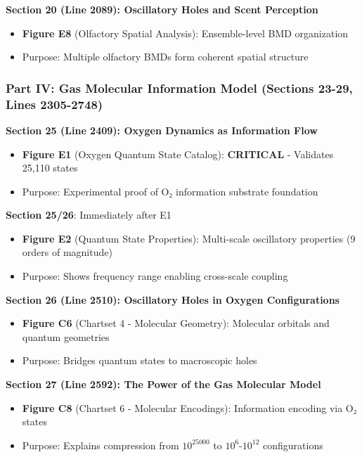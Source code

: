 \documentclass[11pt]{article}
\begin{document}
\textbf{Section 20 (Line 2089): Oscillatory Holes and Scent Perception}
\begin{itemize}
\item \textbf{Figure E8} (Olfactory Spatial Analysis): Ensemble-level BMD organization
\item Purpose: Multiple olfactory BMDs form coherent spatial structure
\end{itemize}

\subsubsection{Part IV: Gas Molecular Information Model (Sections 23-29, Lines 2305-2748)}

\textbf{Section 25 (Line 2409): Oxygen Dynamics as Information Flow}
\begin{itemize}
\item \textbf{Figure E1} (Oxygen Quantum State Catalog): \textbf{CRITICAL} - Validates 25,110 states
\item Purpose: Experimental proof of O₂ information substrate foundation
\end{itemize}

\textbf{Section 25/26}: Immediately after E1
\begin{itemize}
\item \textbf{Figure E2} (Quantum State Properties): Multi-scale oscillatory properties (9 orders of magnitude)
\item Purpose: Shows frequency range enabling cross-scale coupling
\end{itemize}

\textbf{Section 26 (Line 2510): Oscillatory Holes in Oxygen Configurations}
\begin{itemize}
\item \textbf{Figure C6} (Chartset 4 - Molecular Geometry): Molecular orbitals and quantum geometries
\item Purpose: Bridges quantum states to macroscopic holes
\end{itemize}

\textbf{Section 27 (Line 2592): The Power of the Gas Molecular Model}
\begin{itemize}
\item \textbf{Figure C8} (Chartset 6 - Molecular Encodings): Information encoding via O₂ states
\item Purpose: Explains compression from $10^{25000}$ to $10^6$-$10^{12}$ configurations
\end{itemize}
\end{document}
